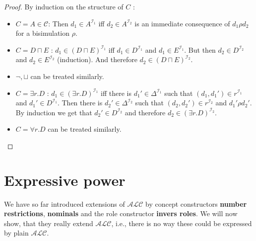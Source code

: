 
\begin{proof}
	By induction on the structure of $C$ :
	\begin{itemize}
		\item $C = A \in \mathscr{C}$:
			Then $d_1 \in A^{\mathcal{I}_1}$ iff $d_2 \in A^{\mathcal{I}_2}$ is an immediate consequence of $d_1 \rho d_2$ for a bisimulation $\rho$.
		\item $C = D \sqcap E$ :
			$d_1 \in \left( D \sqcap E \right)^{\mathcal{I}_1}$ iff $d_1 \in D^{\mathcal{I}_1}$ and $d_1 \in E^{\mathcal{I}_1}$.
			But then $d_2 \in D^{\mathcal{I}_2}$ and $d_2 \in E^{\mathcal{I}_2}$ (induction).
			And therefore $d_2 \in \left( D \sqcap E \right)^{\mathcal{I}_2}$.
		\item $\neg, \sqcup$ can be treated similarly.
		\item $C = \exists r.D$ :
				$d_1 \in \left( \exists r.D \right)^{\mathcal{I}_1}$ iff there is $d_1' \in \Delta^{\mathcal{I}_1}$ such that $(d_1, d_1') \in r^{\mathcal{I}_1}$ and $d_1' \in D^{\mathcal{I}_1}$.
				Then there is $d_2' \in \Delta^{\mathcal{I}_2}$ such that $\left( d_2, d_2' \right) \in r^{\mathcal{I}_2}$ and $d_1' \rho d_2'$.
				By induction we get that $d_2' \in D^{\mathcal{I}_2}$ and therefore  $d_2 \in \left( \exists r.D \right)^{\mathcal{I}_2}$.
			\item $C = \forall r.D$ can be treated similarly.
	\end{itemize}
\end{proof}

\section{Expressive power}
We have so far introduced extensions of $\mathcal{ALC}$ by concept constructors \textbf{number restrictions}, \textbf{nominals} and the role constructor \textbf{invers roles}.
We will now show, that they really extend $\mathcal{ALC}$, i.e., there is no way these could be expressed by plain $\mathcal{ALC}$.


